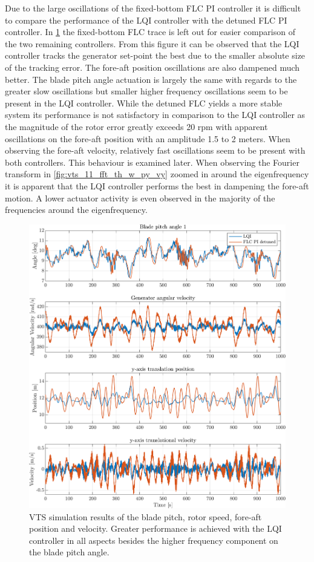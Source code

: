 Due to the large oscillations of the fixed-bottom FLC PI controller it is difficult to compare the performance of the LQI controller with the detuned FLC PI controller. In \cref{fig:vts_10_th_w_py_vy} the fixed-bottom FLC trace is left out for easier comparison of the two remaining controllers. From this figure it can be observed that the LQI controller tracks the generator set-point the best due to the smaller absolute size of the tracking error. The fore-aft position oscillations are also dampened much better. The blade pitch angle actuation is largely the same with regards to the greater slow oscillations but smaller higher frequency oscillations seem to be present in the LQI controller. While the detuned FLC yields a more stable system its performance is not satisfactory in comparison to the LQI controller as the magnitude of the rotor error greatly exceeds 20 rpm with apparent oscillations on the fore-aft position with an amplitude 1.5 to 2 meters. When observing the fore-aft velocity, relatively fast oscillations seem to be present with both controllers. This behaviour is examined later. When observing the Fourier transform in \cref{fig:vts_11_fft_th_w_py_vy} zoomed in around the eigenfrequency it is apparent that the LQI controller performs the best in dampening the fore-aft motion. A lower actuator activity is even observed in the majority of the frequencies around the eigenfrequency.
\begin{figure}[h]
	\centering
	\includegraphics[width=0.7\linewidth]{Graphics/TestResults/VTSplotting/10_th_w_py_vy.png}
	\caption{VTS simulation results of the blade pitch, rotor speed, fore-aft position and velocity. Greater performance is achieved with the LQI controller in all aspects besides the higher frequency component on the blade pitch angle.}
	\label{fig:vts_10_th_w_py_vy}
\end{figure}

